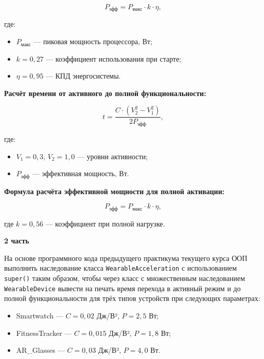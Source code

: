 \begin{enumerate}
\begin{equation}
P_{\text{эфф}} = P_{\text{макс}} \cdot k \cdot \eta,
\end{equation}

где:  
\begin{itemize}
    \item $P_{\text{макс}}$ — пиковая мощность процессора, Вт;  
    \item $k = 0{,}27$ — коэффициент использования при старте;  
    \item $\eta = 0{,}95$ — КПД энергосистемы.  
\end{itemize}

\textbf{Расчёт времени от активного до полной функциональности:}

\begin{equation}
t = \frac{C \cdot (V_2^2 - V_1^2)}{2P_{\text{эфф}}},
\end{equation}

где:  
\begin{itemize}
    \item $V_1 = 0{,}3$, $V_2 = 1{,}0$ — уровни активности;  
    \item $P_{\text{эфф}}$ — эффективная мощность, Вт.  
\end{itemize}

\textbf{Формула расчёта эффективной мощности для полной активации:}

\begin{equation}
P_{\text{эфф}} = P_{\text{макс}} \cdot k \cdot \eta,
\end{equation}

где $k = 0{,}56$ — коэффициент при полной нагрузке.

\textbf{2 часть}

На основе программного кода предыдущего практикума текущего курса ООП выполнить наследование класса \texttt{WearableAcceleration} с использованием \texttt{super()} таким образом, чтобы через класс с множественным наследованием \texttt{WearableDevice} вывести на печать время перехода в активный режим и до полной функциональности для трёх типов устройств при следующих параметрах:

\begin{itemize}
    \item Smartwatch — $C = 0{,}02$ Дж/В², $P = 2{,}5$ Вт;  
    \item FitnessTracker — $C = 0{,}015$ Дж/В², $P = 1{,}8$ Вт;  
    \item AR\_Glasses — $C = 0{,}03$ Дж/В², $P = 4{,}0$ Вт.  
\end{itemize}


\end{enumerate}
